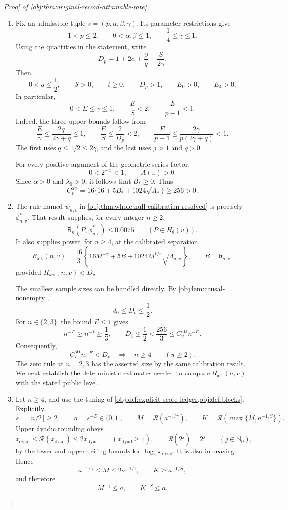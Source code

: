 \documentclass[11pt]{article}
\begin{document}
\begin{proof}[Proof of \cref{obj:thm:original-record-attainable-rate}]
\begin{enumerate}
\item Fix an admissible tuple \(v=(p,\alpha,\beta,\gamma)\). Its parameter restrictions give
\[
1<p\le2,\qquad
0<\alpha,\beta\le1,\qquad
\frac14\le\gamma\le1.
\]
Using the quantities in the statement, write
\[
D_p=1+2\alpha+\frac{\beta}{q}+\frac{S}{2\gamma}.
\]
Then
\[
0<q\le\frac12,\qquad S>0,\qquad t\ge0,\qquad D_p>1,
\qquad E_0>0,\qquad E_4>0.
\]
In particular,
\[
0<E\le\gamma\le1,\qquad
\frac{E}{S}<2,\qquad
\frac{E}{p-1}<1.
\]
Indeed, the three upper bounds follow from
\[
\frac{E}{\gamma}
\le\frac{2q}{2\gamma+q}\le1,
\qquad
\frac{E}{S}\le\frac{2}{D_p}<2,
\qquad
\frac{E}{p-1}
\le\frac{2\gamma}{p(2\gamma+q)}<1.
\]
The first uses \(q\le1/2\le2\gamma\), and the last uses \(p>1\) and \(q>0\).

For every positive argument of the geometric-series factor,
\[
0<2^{-x}<1,\qquad A(x)>0.
\]
Since \(\alpha>0\) and \(\lambda_0>0\), it follows that \(B_*\ge0\). Thus
\[
C^{\mathrm{att}}_v
=16\{16+5B_*+1024\sqrt{A_*}\}
\ge256>0.
\]

\item The rule named \(\psi_{n,v}\) in
\cref{obj:thm:whole-null-calibration-resolved} is precisely
\(\phi^*_{n,v}\). That result supplies, for every integer \(n\ge2\),
\[
\mathsf R_n(P,\phi^*_{n,v})\le0.0075
\qquad(P\in H_0(v)).
\]
It also supplies power, for \(n\ge4\), at the calibrated separation
\[
R_{\mathrm{att}}(n,v)
=\frac{16}{3}
\left\{
16M^{-\gamma}+5B+1024M^{1/4}\sqrt{\Lambda_{n,v}}
\right\},
\qquad B=\mathfrak b_{n,v},
\]
provided \(R_{\mathrm{att}}(n,v)<D_v\).

The smallest sample sizes can be handled directly.
By \cref{obj:lem:causal-nonempty},
\[
d_0\le D_v\le\frac12.
\]
For \(n\in\{2,3\}\), the bound \(E\le1\) gives
\[
n^{-E}\ge n^{-1}\ge\frac13,
\qquad
D_v\le\frac12<\frac{256}{3}
\le C^{\mathrm{att}}_v n^{-E}.
\]
Consequently,
\[
C^{\mathrm{att}}_v n^{-E}<D_v
\quad\Longrightarrow\quad n\ge4
\qquad(n\ge2).
\]
The zero rule at \(n=2,3\) has the asserted size by the same calibration result.
We next establish the deterministic estimates needed to compare
\(R_{\mathrm{att}}(n,v)\) with the stated public level.

\item Let \(n\ge4\), and use the tuning of
\cref{obj:def:explicit-score-ledger,obj:def:blocks}. Explicitly,
\[
s=\lfloor n/2\rfloor\ge2,\qquad
a=s^{-E}\in(0,1],\qquad
M=\mathcal R(a^{-1/\gamma}),\qquad
K=\mathcal R\!\left(\max\{M,a^{-1/S}\}\right).
\]
Upper dyadic rounding obeys
\[
x_{\mathrm{dyad}}\le\mathcal R(x_{\mathrm{dyad}})
\le2x_{\mathrm{dyad}}
\qquad(x_{\mathrm{dyad}}\ge1),
\qquad
\mathcal R(2^j)=2^j\qquad(j\in\mathbb N_0),
\]
by the lower and upper ceiling bounds for \(\log_2 x_{\mathrm{dyad}}\).
It is also increasing. Hence
\[
a^{-1/\gamma}\le M\le2a^{-1/\gamma},
\qquad
K\ge a^{-1/S},
\]
and therefore
\[
M^{-\gamma}\le a,\qquad K^{-S}\le a.
\]


\end{enumerate}
\end{proof}
\end{document}
